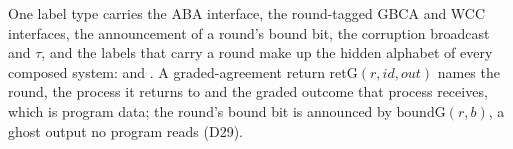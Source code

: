 \begin{definition}
  \label{def:aba-labels}
  \leanok
  One label type carries the ABA interface, the round-tagged GBCA and WCC interfaces, the announcement of a round's bound bit, the corruption broadcast and $\tau$, and the labels that carry a round make up the hidden alphabet of every composed system:  and .
  A graded-agreement return $\mathrm{retG}(r,id,out)$ names the round, the process it returns to and the graded outcome that process receives, which is program data; the round's bound bit is announced by $\mathrm{boundG}(r,b)$, a ghost output no program reads (D29).
\end{definition}
